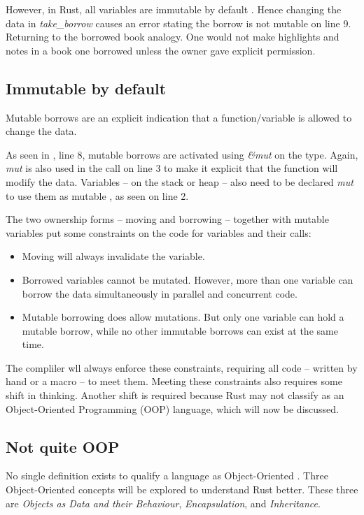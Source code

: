 However, in Rust, all variables are immutable by default \cite{klabnik_2019_01}.
Hence changing the data in \textit{take\_borrow} causes an error stating the borrow is not mutable on line 9.
Returning to the borrowed book analogy.
One would not make highlights and notes in a book one borrowed unless the owner gave explicit permission.

\subsection{Immutable by default}
Mutable borrows are an explicit indication that a function/variable is allowed to change the data.


As seen in , line 8, mutable borrows are activated using \textit{\&mut } on the type.
Again, \textit{mut} is also used in the call on line 3 to make it explicit that the function will modify the data.
Variables -- on the stack or heap -- also need to be declared \textit{mut} to use them as mutable \cite{klabnik_2019_01}, as seen on line 2.

The two ownership forms -- moving and borrowing -- together with mutable variables put some constraints on the code for variables and their calls: \cite{klabnik_2019_01}
\begin{itemize}
	\item Moving will always invalidate the variable.
	\item Borrowed variables cannot be mutated.
	      However, more than one variable can borrow the data simultaneously in parallel and concurrent code.
	\item Mutable borrowing does allow mutations.
	      But only one variable can hold a mutable borrow, while no other immutable borrows can exist at the same time.
\end{itemize}

The compliler wll always enforce these constraints, requiring all code -- written by hand or a macro -- to meet them.
Meeting these constraints also requires some shift in thinking.
Another shift is required because Rust may not classify as an Object-Oriented Programming (OOP) language, which will now be discussed.

\subsection{Not quite OOP}
No single definition exists to qualify a language as Object-Oriented \cite{meyer_97_01,stefik_85_01,gamma_94_01,klabnik_2019_01}.
Three Object-Oriented concepts will be explored to understand Rust better.
These three are \textit{Objects as Data and their Behaviour}, \textit{Encapsulation}, and \textit{Inheritance}.


